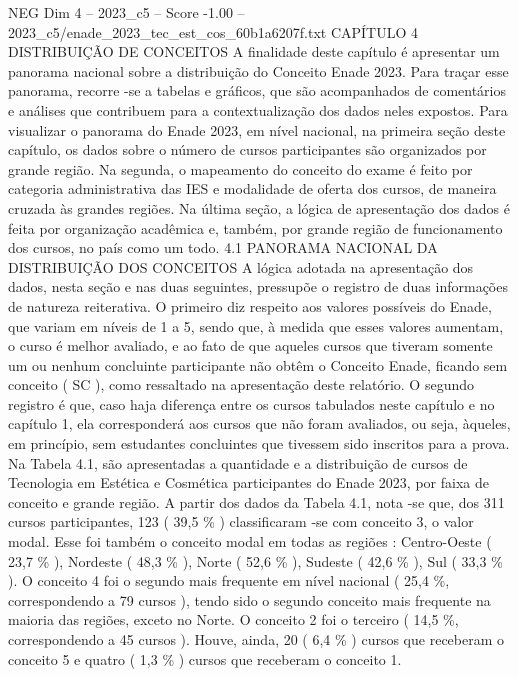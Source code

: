 \begin{textsample}{NEG Dim 4 – 2023\_c5 – Score -1.00 – 2023\_c5/enade\_2023\_tec\_est\_cos\_60b1a6207f.txt}  \label{ex:f4_neg_092}
CAPÍTULO 4 DISTRIBUIÇÃO DE CONCEITOS A finalidade deste capítulo é apresentar um panorama nacional sobre a distribuição do Conceito Enade 2023.
Para traçar esse panorama, recorre -se a tabelas e gráficos, que são acompanhados de comentários e análises que contribuem para a contextualização dos dados neles expostos.
Para visualizar o panorama do Enade 2023, em nível nacional, na primeira seção deste capítulo, os dados sobre o número de cursos participantes são organizados por grande região.
Na segunda, o mapeamento do conceito do exame é feito por categoria administrativa das IES e modalidade de oferta dos cursos, de maneira cruzada às grandes regiões.
Na última seção, a lógica de apresentação dos dados é feita por organização acadêmica e, também, por grande região de funcionamento dos cursos, no país como um todo. 4.1 PANORAMA NACIONAL DA DISTRIBUIÇÃO DOS CONCEITOS A lógica adotada na apresentação dos dados, nesta seção e nas duas seguintes, pressupõe o registro de duas informações de natureza reiterativa.
O primeiro diz respeito aos valores possíveis do Enade, que variam em níveis de 1 a 5, sendo que, à medida que esses valores aumentam, o curso é melhor avaliado, e ao fato de que aqueles cursos que tiveram somente um ou nenhum concluinte participante não obtêm o Conceito Enade, ficando sem conceito ( SC ), como ressaltado na apresentação deste relatório.
O segundo registro é que, caso haja diferença entre os cursos tabulados neste capítulo e no capítulo 1, ela corresponderá aos cursos que não foram avaliados, ou seja, àqueles, em princípio, sem estudantes concluintes que tivessem sido inscritos para a prova.
Na Tabela 4.1, são apresentadas a quantidade e a distribuição de cursos de Tecnologia em Estética e Cosmética participantes do Enade 2023, por faixa de conceito e grande região.
A partir dos dados da Tabela 4.1, nota -se que, dos 311 cursos participantes, 123 ( 39,5 \% ) classificaram -se com conceito 3, o valor modal.
Esse foi também o conceito modal em todas as regiões : Centro-Oeste ( 23,7 \% ), Nordeste ( 48,3 \% ), Norte ( 52,6 \% ), Sudeste ( 42,6 \% ), Sul ( 33,3 \% ).
O conceito 4 foi o segundo mais frequente em nível nacional ( 25,4 \%, correspondendo a 79 cursos ), tendo sido o segundo conceito mais frequente na maioria das regiões, exceto no Norte.
O conceito 2 foi o terceiro ( 14,5 \%, correspondendo a 45 cursos ).
Houve, ainda, 20 ( 6,4 \% ) cursos que receberam o conceito 5 e quatro ( 1,3 \% ) cursos que receberam o conceito 1.

\end{textsample}
